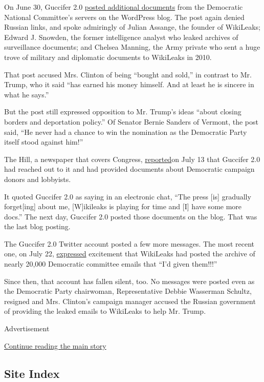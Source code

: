 On June 30, Guccifer 2.0
\href{https://guccifer2.wordpress.com/2016/06/30/faq/}{posted additional
documents} from the Democratic National Committee's servers on the
WordPress blog. The post again denied Russian links, and spoke
admiringly of Julian Assange, the founder of WikiLeaks; Edward J.
Snowden, the former intelligence analyst who leaked archives of
surveillance documents; and Chelsea Manning, the Army private who sent a
huge trove of military and diplomatic documents to WikiLeaks in 2010.

That post accused Mrs. Clinton of being ``bought and sold,'' in contrast
to Mr. Trump, who it said ``has earned his money himself. And at least
he is sincere in what he says.''

But the post still expressed opposition to Mr. Trump's ideas ``about
closing borders and deportation policy.'' Of Senator Bernie Sanders of
Vermont, the post said, ``He never had a chance to win the nomination as
the Democratic Party itself stood against him!''

The Hill, a newspaper that covers Congress,
\href{http://thehill.com/policy/cybersecurity/287558-guccifer-20-drops-new-dnc-docs}{reported}on
July 13 that Guccifer 2.0 had reached out to it and had provided
documents about Democratic campaign donors and lobbyists.

It quoted Guccifer 2.0 as saying in an electronic chat, ``The press
{[}is{]} gradually forget{[}ing{]} about me, {[}W{]}ikileaks is playing
for time and {[}I{]} have some more docs.'' The next day, Guccifer 2.0
posted those documents on the blog. That was the last blog posting.

The Guccifer 2.0 Twitter account posted a few more messages. The most
recent one, on July 22,
\href{https://twitter.com/GUCCIFER_2/status/756530278982684672}{expressed}
excitement that WikiLeaks had posted the archive of nearly 20,000
Democratic committee emails that ``I'd given them!!!''

Since then, that account has fallen silent, too. No messages were posted
even as the Democratic Party chairwoman, Representative Debbie Wasserman
Schultz, resigned and Mrs. Clinton's campaign manager accused the
Russian government of providing the leaked emails to WikiLeaks to help
Mr. Trump.

Advertisement

\protect\hyperlink{after-bottom}{Continue reading the main story}

\hypertarget{site-index}{%
\subsection{Site Index}\label{site-index}}

